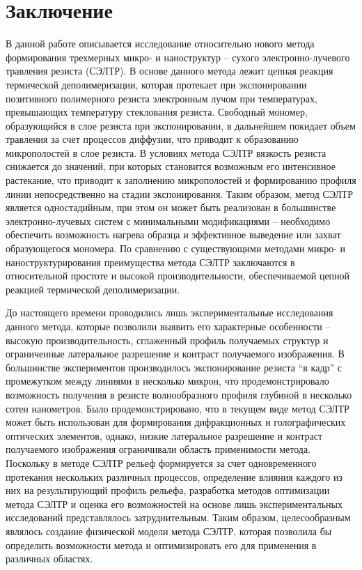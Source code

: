 \chapter*{Заключение}

В данной работе описывается исследование относительно нового метода формирования трехмерных микро- и наноструктур -- сухого электронно-лучевого травления резиста (СЭЛТР). В основе данного метода лежит цепная реакция термической деполимеризации, которая протекает при экспонировании позитивного полимерного резиста электронным лучом при температурах, превышающих температуру стеклования резиста. Свободный мономер, образующийся в слое резиста при экспонировании, в дальнейшем покидает объем травления за счет процессов диффузии, что приводит к образованию микрополостей в слое резиста. В условиях метода СЭЛТР вязкость резиста снижается до значений, при которых становится возможным его интенсивное растекание, что приводит к заполнению микрополостей и формированию профиля линии непосредственно на стадии экспонирования. Таким образом, метод СЭЛТР является одностадийным, при этом он может быть реализован в большинстве электронно-лучевых систем с минимальными модификациями -- необходимо обеспечить возможность нагрева образца и эффективное выведение или захват образующегося мономера. По сравнению с существующими методами микро- и наноструктурирования преимущества метода СЭЛТР заключаются в относительной простоте и высокой производительности, обеспечиваемой цепной реакцией термической деполимеризации.

До настоящего времени проводились лишь экспериментальные исследования данного метода, которые позволили выявить его характерные особенности -- высокую производительность, сглаженный профиль получаемых структур и ограниченные латеральное разрешение и контраст получаемого изображения. В большинстве экспериментов производилось экспонирование резиста ``в кадр'' с промежутком между линиями в несколько микрон, что продемонстрировало возможность получения в резисте волнообразного профиля глубиной в несколько сотен нанометров. Было продемонстрировано, что в текущем виде метод СЭЛТР может быть использован для формирования дифракционных и голографических оптических элементов, однако, низкие латеральное разрешение и контраст получаемого изображения ограничивали область применимости метода. Поскольку в методе СЭЛТР рельеф формируется за счет одновременного протекания нескольких различных процессов, определение влияния каждого из них на результирующий профиль рельефа, разработка методов оптимизации метода СЭЛТР и оценка его возможностей на основе лишь экспериментальных исследований представлялось затруднительным. Таким образом, целесообразным являлось создание физической модели метода СЭЛТР, которая позволила бы определить возможности метода и оптимизировать его для применения в различных областях.

